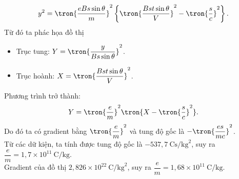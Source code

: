 \begin{loigiai}
\begin{enumerate}[1)]
    \[y^2 = {\tron{\dfrac{eBs\sin\theta}{m} }^2}\left\{\tron{\dfrac{Bs t \sin\theta}{V}}^2 - \tron{\dfrac{s}{c}}^2\right\}.\]
    Từ đó ta phác họa đồ thị
    \begin{itemize}
        \item Trục tung: $Y = \tron{\dfrac{y}{Bs\sin\theta}}^2$.
        \item Trục hoành: $X = \tron{\dfrac{Bst\sin\theta}{V}}^2$.
    \end{itemize}
    Phương trình trở thành:
    \[Y = \tron{\dfrac{e}{m}}^2 \tron{X - \tron{\dfrac{s}{c}}^2}. \]
    Do đó ta có gradient bằng $\tron{\dfrac{e}{m}}^2$ và tung độ gốc là $-\tron{\dfrac{es}{mc}}^2$.\\
    Từ các dữ kiện, ta tính được tung độ gốc là $-537,7~ \mathrm{Cs/kg}^2$, suy ra $\dfrac{e}{m} = 1,7 \times 10^{11} ~\mathrm{C/kg}$.\\
    Gradient của đồ thị $2,826 \times 10^{22}~\mathrm{C/kg}^2$, suy ra $\dfrac{e}{m} = 1,68 \times 10^{11}~\mathrm{C/kg}$.
\end{enumerate}
\end{loigiai}


